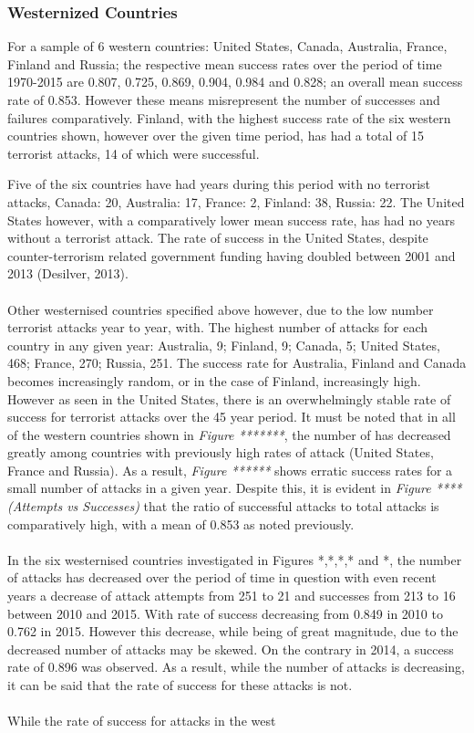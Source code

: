 \documentclass[10pt,a4paper]{article}
\begin{document}
\subsubsection{Westernized Countries}
For a sample of 6 western countries: United States, Canada, Australia, France, Finland and Russia; the respective mean success rates over the period of time 1970-2015 are 0.807, 0.725, 0.869, 0.904, 0.984 and 0.828; an overall mean success rate of 0.853. However these means misrepresent the number of successes and failures comparatively. Finland, with the highest success rate of the six western countries shown, however over the given time period, has had a total of 15 terrorist attacks, 14 of which were successful. 

Five of the six countries have had years during this period with no terrorist attacks, Canada: 20, Australia: 17, France: 2, Finland: 38, Russia: 22. The United States however, with a comparatively lower mean success rate, has had no years without a terrorist attack. The rate of success in the United States, despite counter-terrorism related government funding having doubled between 2001 and 2013 (Desilver, 2013).
\\\\
Other westernised countries specified above however, due to the low number terrorist attacks year to year, with.
The highest number of attacks for each country in any given year: Australia, 9; Finland, 9; Canada, 5; United States, 468; France, 270; Russia, 251. The success rate for Australia, Finland and Canada becomes increasingly random, or in the case of Finland, increasingly high. However as seen in the United States, there is an overwhelmingly stable rate of success for terrorist attacks over the 45 year period. It must be noted that in all of the western countries shown in \textit{Figure *******}, the number of has decreased greatly among countries with previously high rates of attack (United States, France and Russia). As a result, \textit{Figure ******} shows erratic success rates for a small number of attacks in a given year. Despite this, it is evident in \textit{Figure **** (Attempts vs Successes)} that the ratio of successful attacks to total attacks is comparatively high, with a mean of 0.853 as noted previously.
\\\\
In the six westernised countries investigated in Figures *,*,*,* and *, the number of attacks has decreased over the period of time in question with even recent years a decrease of attack attempts from 251 to 21 and successes from 213 to 16 between 2010 and 2015. With rate of success decreasing from 0.849 in 2010 to 0.762 in 2015. However this decrease, while being of great magnitude, due to the decreased number of attacks may be skewed. On the contrary in 2014, a success rate of 0.896 was observed. As a result, while the number of attacks is decreasing, it can be said that the rate of success for these attacks is not.
\\\\
While the rate of success for attacks in the west
\end{document}
